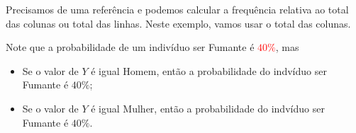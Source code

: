 \documentclass[
  10pt,
  ignorenonframetext,
]{beamer}
\begin{document}
\begin{frame}
Precisamos de uma referência e podemos calcular a frequência relativa ao
total das colunas ou total das linhas. Neste exemplo, vamos usar o total
das colunas.

\begin{table}[htbp]
    \centering
    \caption{Tabela de distribuição de frequência relativa ao total das colunas.}
    
\end{table}

Note que a probabilidade de um indivíduo ser Fumante é
\textcolor{red}{$40\%$}, mas

\begin{itemize}
    \item Se o valor de $Y$ é igual Homem, então a probabilidade do indvíduo ser Fumante é {\color{brown} $40\%$};
    \item Se o valor de $Y$ é igual Mulher, então a probabilidade do indvíduo ser Fumante é {\color{blue} $40\%$}.
\end{itemize}
\end{frame}
\end{document}
